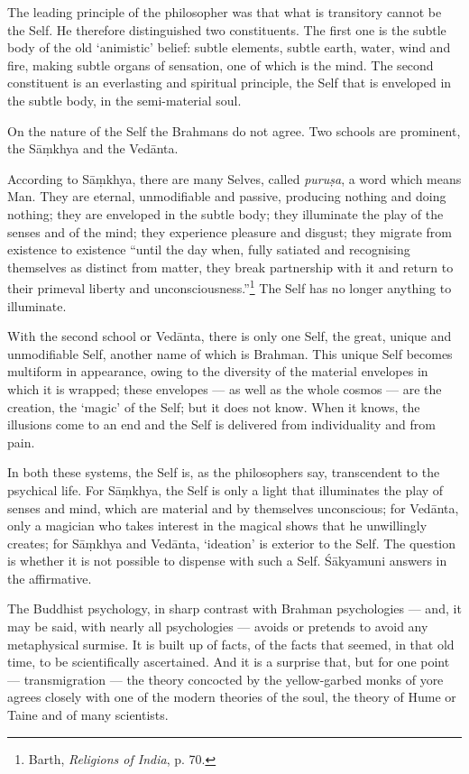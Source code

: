 \documentclass[a4paper, 11pt, oneside, english]{article}
\begin{document}
The leading principle of the philosopher was that what is transitory cannot be the Self. He therefore distinguished two constituents. The first one is the subtle body of the old `animistic' belief: subtle elements, subtle earth, water, wind and fire, making subtle organs of sensation, one of which is the mind. The second constituent is an everlasting and spiritual principle, the Self that is enveloped in the subtle body, in the semi-material soul.

On the nature of the Self the Brahmans do not agree. Two schools are prominent, the Sāṃkhya and the Vedānta.

According to Sāṃkhya, there are many Selves, called \emph{puruṣa}, a word which means Man. They are eternal, unmodifiable and passive, producing nothing and doing nothing; they are enveloped in the subtle body; they illuminate the play of the senses and of the mind; they experience pleasure and disgust; they migrate from existence to existence ``until the day when, fully satiated and recognising themselves as distinct from matter, they break partnership with it and return to their primeval liberty and unconsciousness.''\footnote{Barth, \emph{Religions of India}, p. 70.} The Self has no longer anything to illuminate.

With the second school or Vedānta, there is only one Self, the great, unique and unmodifiable Self, another name of which is Brahman. This unique Self becomes multiform in appearance, owing to the diversity of the material envelopes in which it is wrapped; these envelopes --- as well as the whole cosmos --- are the creation, the `magic' of the Self; but it does not know. When it knows, the illusions come to an end and the Self is delivered from individuality and from pain.

In both these systems, the Self is, as the philosophers say, transcendent to the psychical life. For Sāṃkhya, the Self is only a light that illuminates the play of senses and mind, which are material and by themselves unconscious; for Vedānta, only a magician who takes interest in the magical shows that he unwillingly creates; for Sāṃkhya and Vedānta, `ideation' is exterior to the Self. The question is whether it is not possible to dispense with such a Self. Śākyamuni answers in the affirmative.

The Buddhist psychology, in sharp contrast with Brahman psychologies --- and, it may be said, with nearly all psychologies --- avoids or pretends to avoid any metaphysical surmise. It is built up of facts, of the facts that seemed, in that old time, to be scientifically ascertained. And it is a surprise that, but for one point --- transmigration --- the theory concocted by the yellow-garbed monks of yore agrees closely with one of the modern theories of the soul, the theory of Hume or Taine and of many scientists.
\end{document}

